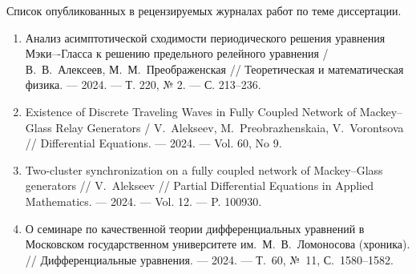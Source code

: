 Список опубликованных в рецензируемых журналах работ по теме диссертации.
\begin{enumerate}
	\item Анализ асимптотической сходимости периодического решения уравнения Мэки–-Гласса к решению предельного релейного уравнения / В.~В.~Алексеев, М.~М.~Преображенская // Теоретическая и математическая физика. --- 2024. --- Т. 220, № 2. --- С. 213--236. \cite{wosbib1}
	\item Existence of Discrete Traveling Waves in Fully Coupled Network of Mackey--Glass Relay Generators / V.~Alekseev, M.~Preobrazhenskaia, V.~Vorontsova // Differential Equations. --- 2024. --- Vol. 60, No 9. \cite{wosbib2}
	\item Two-cluster synchronization on a fully coupled network of Mackey--Glass generators // V.~Alekseev // Partial Differential Equations in Applied Mathematics. --- 2024. --- Vol. 12. --- P. 100930. \cite{scbib1}
	\item О семинаре по качественной теории дифференциальных уравнений в Московском государственном университете им.~М.~В.~Ломоносова (хроника). // Дифференциальные уравнения. --- 2024. --- Т.~60, №~11, С.~1580--1582. \cite{Sergeev2024}
\end{enumerate}

\medskip

